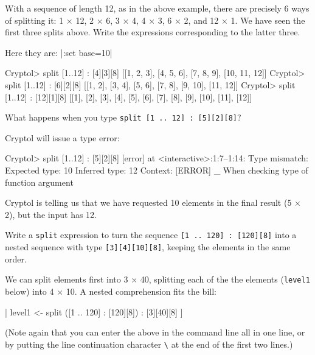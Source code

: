 \restartrepl
\begin{Exercise}\label{ex:split:0}
  With a sequence of length 12, as in the above example, there are
  precisely 6 ways of splitting it: 1 $\times$ 12, 2 $\times$ 6, 3
  $\times$ 4, 4 $\times$ 3, 6 $\times$ 2, and 12 $\times$ 1. We have
  seen the first three splits above. Write the expressions
  corresponding to the latter three.\indSplit
\end{Exercise}
\begin{Answer}
  Here they are:\indSplit
\hidereplin|:set base=10|
\begin{replPrompt}
  Cryptol> split [1..12] : [4][3][8]
  [[1, 2, 3], [4, 5, 6], [7, 8, 9], [10, 11, 12]]
  Cryptol> split [1..12] : [6][2][8]
  [[1, 2], [3, 4], [5, 6], [7, 8], [9, 10], [11, 12]]
  Cryptol> split [1..12] : [12][1][8]
  [[1], [2], [3], [4], [5], [6], [7], [8], [9], [10], [11], [12]]
\end{replPrompt}
\end{Answer}

\restartrepl
\begin{Exercise}\label{ex:split:1}
  What happens when you type
  \texttt{split [1 ..\ 12] :\ [5][2][8]}?\indSplit
\end{Exercise}
\begin{Answer}
Cryptol will issue a type error:\indSplit
\begin{replPrompt}
  Cryptol> split [1..12] : [5][2][8]
  [error] at <interactive>:1:7--1:14:
    Type mismatch:
      Expected type: 10
      Inferred type: 12
      Context: [ERROR] _
      When checking type of function argument
\end{replPrompt}
Cryptol is telling us that we have requested 10 elements in the final
result (5 $\times$ 2), but the input has 12.
\end{Answer}

\begin{Exercise}\label{ex:split:2}
  Write a \texttt{split} expression to turn the sequence \texttt{[1 ..\ 120]
    :\ [120][8]} into a nested sequence with type {\tt [3][4][10][8]},
  keeping the elements in the same order.\indSplit {}  \indComp
\end{Exercise}
\begin{Answer}
  We can split elements first into 3 $\times$ 40, splitting each
  of the the elements ({\tt level1} below) into 4 $\times$ 10. A nested
  comprehension fits the bill:\indComp
\restartrepl
\begin{replinVerb}
  [ split level1 : [4][10][8] | level1 <- split ([1 .. 120] : [120][8]) : [3][40][8] ]
\end{replinVerb}
(Note again that you can enter the above in the command line all in
one line, or by putting the line continuation character
\texttt{\textbackslash} at the end of the first two
lines.)\indLineCont {}
\end{Answer}

